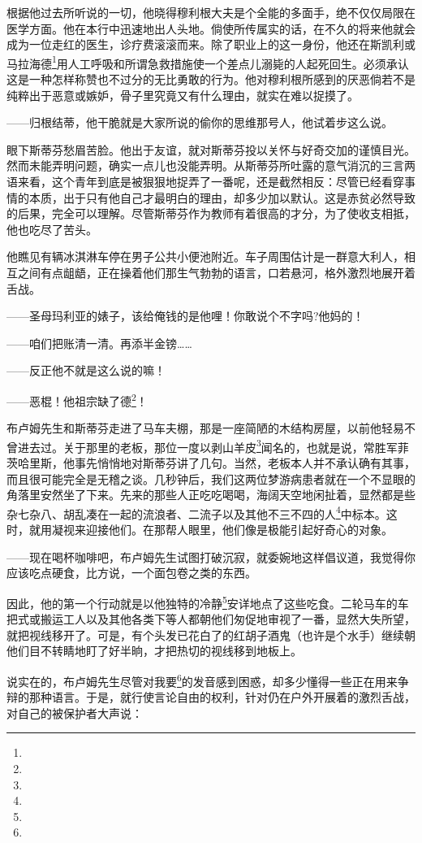 \par 根据他过去所听说的一切，他晓得穆利根大夫是个全能的多面手，绝不仅仅局限在医学方面。他在本行中迅速地出人头地。倘使所传属实的话，在不久的将来他就会成为一位走红的医生，诊疗费滚滚而来。除了职业上的这一身份，他还在斯凯利或马拉海德\footnote{}用人工呼吸和所谓急救措施使一个差点儿溺毙的人起死回生。必须承认这是一种怎样称赞也不过分的无比勇敢的行为。他对穆利根所感到的厌恶倘若不是纯粹出于恶意或嫉妒，骨子里究竟又有什么理由，就实在难以捉摸了。
\par ——归根结蒂，他干脆就是大家所说的偷你的思维那号人，他试着步这么说。
\par 眼下斯蒂芬愁眉苦脸。他出于友谊，就对斯蒂芬投以关怀与好奇交加的谨慎目光。然而未能弄明问题，确实一点儿也没能弄明。从斯蒂芬所吐露的意气消沉的三言两语来看，这个青年到底是被狠狠地捉弄了一番呢，还是截然相反：尽管已经看穿事情的本质，出于只有他自己才最明白的理由，却多少加以默认。这是赤贫必然导致的后果，完全可以理解。尽管斯蒂芬作为教师有着很高的才分，为了使收支相抵，他也吃尽了苦头。
\par 他瞧见有辆冰淇淋车停在男子公共小便池附近。车子周围估计是一群意大利人，相互之间有点龃龉，正在操着他们那生气勃勃的语言，口若悬河，格外激烈地展开着舌战。
\par ——圣母玛利亚的婊子，该给俺钱的是他哩！你敢说个不字吗?他妈的！
\par ——咱们把账清一清。再添半金镑……
\par ——反正他不就是这么说的嘛！
\par ——恶棍！他祖宗缺了德\footnote{}！
\par 布卢姆先生和斯蒂芬走进了马车夫棚，那是一座简陋的木结构房屋，以前他轻易不曾进去过。关于那里的老板，那位一度以剥山羊皮\footnote{}闻名的，也就是说，常胜军菲茨哈里斯，他事先悄悄地对斯蒂芬讲了几句。当然，老板本人并不承认确有其事，而且很可能完全是无稽之谈。几秒钟后，我们这两位梦游病患者就在一个不显眼的角落里安然坐了下来。先来的那些人正吃吃喝喝，海阔天空地闲扯着，显然都是些杂七杂八、胡乱凑在一起的流浪者、二流子以及其他不三不四的人\footnote{}中标本。这时，就用凝视来迎接他们。在那帮人眼里，他们像是极能引起好奇心的对象。
\par ——现在喝杯咖啡吧，布卢姆先生试图打破沉寂，就委婉地这样倡议道，我觉得你应该吃点硬食，比方说，一个面包卷之类的东西。
\par 因此，他的第一个行动就是以他独特的冷静\footnote{}安详地点了这些吃食。二轮马车的车把式或搬运工人以及其他各类下等人都朝他们匆促地审视了一番，显然大失所望，就把视线移开了。可是，有个头发已花白了的红胡子酒鬼（也许是个水手）继续朝他们目不转睛地盯了好半晌，才把热切的视线移到地板上。
\par 说实在的，布卢姆先生尽管对我要\footnote{}的发音感到困惑，却多少懂得一些正在用来争辩的那种语言。于是，就行使言论自由的权利，针对仍在户外开展着的激烈舌战，对自己的被保护者大声说：

